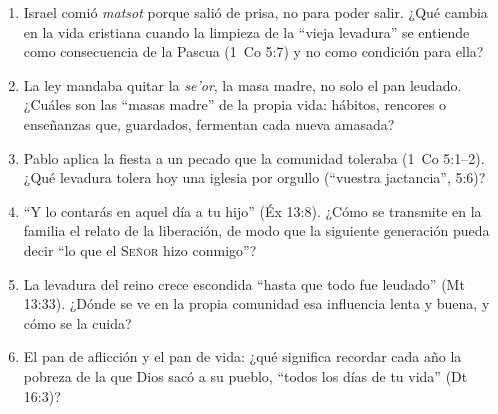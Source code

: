 \documentclass[11pt,letterpaper]{article}
\newcommand{\SENOR}{\textsc{Señor}}
\begin{document}
\begin{enumerate}
\item Israel comió \emph{matsot} porque salió de prisa, no para poder salir. ¿Qué cambia en la vida cristiana cuando la limpieza de la ``vieja levadura'' se entiende como consecuencia de la Pascua (1~Co 5:7) y no como condición para ella?
\item La ley mandaba quitar la \emph{se'or}, la masa madre, no solo el pan leudado. ¿Cuáles son las ``masas madre'' de la propia vida: hábitos, rencores o enseñanzas que, guardados, fermentan cada nueva amasada?
\item Pablo aplica la fiesta a un pecado que la comunidad toleraba (1~Co 5:1--2). ¿Qué levadura tolera hoy una iglesia por orgullo (``vuestra jactancia'', 5:6)?
\item ``Y lo contarás en aquel día a tu hijo'' (Éx 13:8). ¿Cómo se transmite en la familia el relato de la liberación, de modo que la siguiente generación pueda decir ``lo que el \SENOR{} hizo conmigo''?
\item La levadura del reino crece escondida ``hasta que todo fue leudado'' (Mt 13:33). ¿Dónde se ve en la propia comunidad esa influencia lenta y buena, y cómo se la cuida?
\item El pan de aflicción y el pan de vida: ¿qué significa recordar cada año la pobreza de la que Dios sacó a su pueblo, ``todos los días de tu vida'' (Dt 16:3)?
\end{enumerate}

\end{document}
